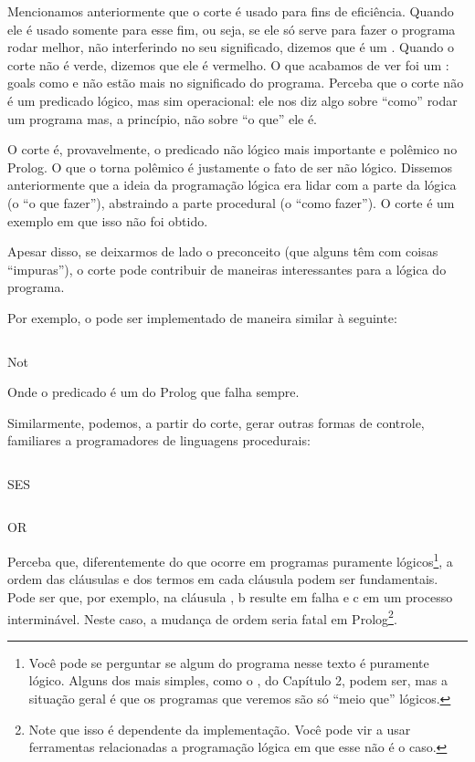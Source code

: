 \documentclass{article}
\begin{document}
Mencionamos anteriormente que o corte é usado para fins de
eficiência. Quando ele é usado somente para esse fim, ou seja, se ele
só serve para fazer o programa rodar melhor, não interferindo no seu
significado, dizemos que é um .  Quando o corte
não é verde, dizemos que ele é vermelho. O que acabamos de ver foi um
: goals como  e
 não estão mais no significado do programa. Perceba que
o corte não é um predicado lógico, mas sim operacional: ele nos diz
algo sobre ``como'' rodar um programa mas, a princípio, não sobre ``o
que'' ele é.

O corte é, provavelmente, o predicado não lógico mais importante e
polêmico no Prolog. O que o torna polêmico é justamente o fato de ser
não lógico. Dissemos anteriormente que a ideia da programação lógica
era lidar com a parte da lógica (o ``o que fazer''), abstraindo a
parte procedural (o ``como fazer''). O corte é um exemplo em que isso
não foi obtido.

Apesar disso, se deixarmos de lado o preconceito (que alguns têm com
coisas ``impuras''), o corte pode
contribuir de maneiras interessantes para a lógica do programa.

Por exemplo, o  pode ser implementado de maneira similar
à seguinte:

\begin{listing}
  \inputminted{prolog}{../Exemplos/Cap4/prog3_not.pl}
  \caption{Not}
\end{listing}

Onde o predicado  é um  do Prolog que
falha sempre.

Similarmente, podemos, a partir do corte, gerar outras formas de
controle, familiares a programadores de linguagens procedurais:

\begin{listing}
  \inputminted{prolog}{../Exemplos/Cap4/prog4_ifthenelse.pl}
  \caption{SES}
\end{listing}

\begin{listing}
  \inputminted{prolog}{../Exemplos/Cap4/prog5_or.pl}
  \caption{OR}
\end{listing}

Perceba que, diferentemente do que ocorre em programas puramente
lógicos\footnote{Você pode se perguntar se algum do programa nesse
  texto é puramente lógico. Alguns dos mais simples, como o
  , do Capítulo 2, %
  podem ser, mas a situação geral é que os programas
  que veremos são só ``meio que'' lógicos.}, a ordem das cláusulas e
dos termos em cada cláusula podem ser fundamentais. Pode ser que, por
exemplo, na cláusula , b resulte em falha e c em
um processo interminável. Neste caso, a mudança de ordem seria
fatal em Prolog\footnote{Note que isso é dependente da implementação. Você pode
  vir a usar ferramentas relacionadas a programação lógica em que esse
  não é o caso.}.
\end{document}

